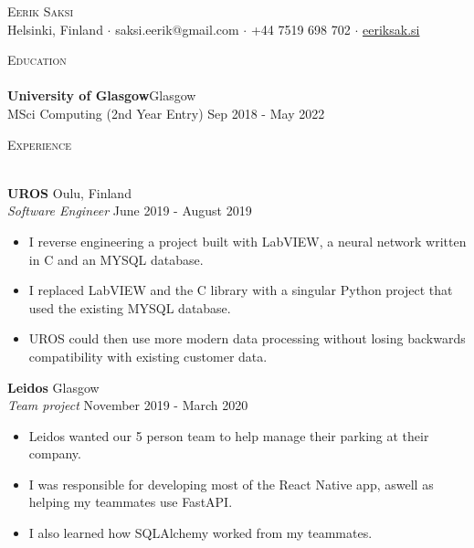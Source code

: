\documentclass[a4paper]{article}
\newcommand{\lineunder} {
    \vspace*{-8pt} \\
    \hspace*{-18pt} \hrulefill \\
}
\newcommand{\header} [1] {
    {\hspace*{-18pt}\vspace*{6pt} \textsc{#1}}
    \vspace*{-6pt} \lineunder
}
\begin{document}
\vspace*{-40pt}

    

\vspace*{-10pt}
\begin{center}
	{\Huge \scshape {Eerik Saksi}}\\
  Helsinki, Finland $\cdot$ saksi.eerik@gmail.com $\cdot$ +44 7519 698 702 $\cdot$ \url{eeriksak.si}  \\
\end{center}

\header{Education}
\textbf{University of Glasgow}\hfill Glasgow\\
    MSci Computing (2nd Year Entry) \hfill Sep 2018 - May 2022\\
\vspace{2mm}

\header{Experience}
\vspace{1mm}

\textbf{UROS} \hfill Oulu, Finland\\
\textit{Software Engineer} \hfill June 2019 - August 2019\\
\vspace{-1mm}
\begin{itemize} \itemsep 1pt
	\item I reverse engineering a project built with LabVIEW, a neural network written in C and an MYSQL database.
  \item I replaced LabVIEW and the C library with a singular Python project that used the existing MYSQL database.
  \item UROS could then use more modern data processing without losing backwards compatibility with existing customer data.

\end{itemize}
\textbf{Leidos} \hfill Glasgow\\
\textit{Team project} \hfill November 2019 - March 2020\\
\vspace{-1mm}
\begin{itemize} \itemsep 1pt
	\item Leidos wanted our 5 person team to help manage their parking at their company.
  \item I was responsible for developing most of the React Native app, aswell as helping my teammates use FastAPI.
  \item I also learned how SQLAlchemy worked from my teammates.
\end{itemize}
\end{document}

